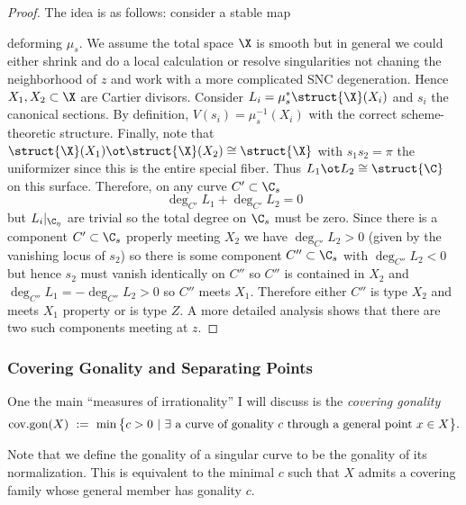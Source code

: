 \documentclass[12pt]{article}
\theoremstyle{plain}
\DeclareMathOperator{\cov}{cov.gon}
\begin{document}
\begin{proof}
The idea is as follows: consider a stable map
\begin{center}
\end{center} 
deforming $\mu_s$. We assume the total space $\X$ is smooth but in general we could either shrink and do a local calculation or resolve singularities not chaning the neighborhood of $z$ and work with a more complicated SNC degeneration. Hence $X_1, X_2 \subset \X$ are Cartier divisors. Consider $L_i = \mu_s^* \struct{\X}(X_i)$ and $s_i$ the canonical sections. By definition, $V(s_i) = \mu_s^{-1}(X_i)$ with the correct scheme-theoretic structure. Finally, note that $\struct{\X}(X_1) \ot \struct{\X}(X_2) \cong \struct{\X}$ with $s_1 s_2 = \pi$ the uniformizer since this is the entire special fiber. Thus $L_1 \ot L_2 \cong \struct{\C}$ on this surface. Therefore, on any curve $C' \subset \C_s$
\[ \deg_{C'}{L_1} + \deg_{C'}{L_2} = 0 \]
but $L_i|_{\C_\eta}$ are trivial so the total degree on $\C_s$ must be zero. Since there is a component $C' \subset \C_s$ properly meeting $X_2$ we have $\deg_{C'}{L_2} > 0$ (given by the vanishing locus of $s_2$) so there is some component $C'' \subset \C_s$  with $\deg_{C''}{L_2} < 0$ but hence $s_2$ must vanish identically on $C''$ so $C''$ is contained in $X_2$ and $\deg_{C''}{L_1} = - \deg_{C''}{L_2} > 0$ so $C''$ meets $X_1$. Therefore either $C''$ is type $X_2$ and meets $X_1$ property or is type $Z$. A more detailed analysis shows that there are two such components meeting at $z$.
\end{proof}

\subsubsection{Covering Gonality and Separating Points}

One the main ``measures of irrationality'' I will discuss is the \textit{covering gonality}
\[ \cov(X)\ :=\ \min\big\{c>0\ |\ \exists\textup{ a curve of gonality } c \textup{ through a general point } x\in X\big\}.\]

\begin{rmk}
Note that we define the gonality of a singular curve to be the gonality of its normalization. 
This is equivalent to the minimal $c$ such that $X$ admits a covering family whose general member has gonality $c$.
\end{rmk}
\end{document}
